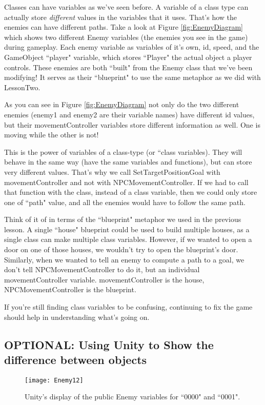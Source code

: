 \documentclass{article}
\begin{document}
Classes can have variables as we've seen before. A variable of a class type can actually store \textit{different} values in the variables that it uses. That's how the enemies can have different paths. Take a look at Figure \ref{fig:EnemyDiagram} which shows two different Enemy variables (the enemies you see in the game) during gameplay. Each enemy variable as variables of it's own, id, speed, and the GameObject ``player" variable, which stores ``Player" the actual object a player controls. These enemies are both ``built" from the Enemy class that we've been modifying! It serves as their ``blueprint" to use the same metaphor as we did with LessonTwo.

As you can see in Figure \ref{fig:EnemyDiagram} not only do the two different enemies (enemy1 and enemy2 are their variable names) have different id values, but their movementController variables store different information as well. One is moving while the other is not!

This is the power of variables of a class-type (or ``class variables). They will behave in the same way (have the same variables and functions), but can store very different values. That's why we call SetTargetPositionGoal with movementController and not with NPCMovementController. If we had to call that function with the class, instead of a class variable, then we could only store one of ``path" value, and all the enemies would have to follow the same path.

Think of it of in terms of the ``blueprint" metaphor we used in the previous lesson. A single ``house" blueprint could be used to build multiple houses, as a single class can make multiple class variables. However, if we wanted to open a door on one of those houses, we wouldn't try to open the blueprint's door. Similarly, when we wanted to tell an enemy to compute a path to a goal, we don't tell NPCMovementController to do it, but an individual movementController variable. movementController is the house, NPCMovementController is the blueprint.

If you're still finding class variables to be confusing, continuing to fix the game should help in understanding what's going on.

\subsection{OPTIONAL: Using Unity to Show the difference between objects}

\begin{figure}
  \texttt{[image: Enemy12]}
  \caption{Unity's display of the public Enemy variables for ``0000" and ``0001".}
  \label{fig:Enemy12}
\end{figure}
\end{document}
